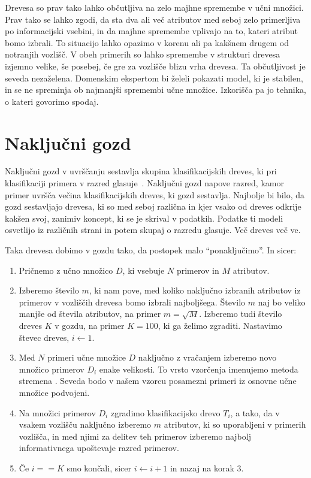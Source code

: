 Drevesa so prav tako lahko občutljiva na zelo majhne spremembe v učni množici. Prav tako se lahko zgodi, da sta dva ali več atributov med seboj zelo primerljiva po informacijski vsebini, in da majhne spremembe vplivajo na to, kateri atribut bomo izbrali. To situacijo lahko opazimo v korenu ali pa kakšnem drugem od notranjih vozlišč. V obeh primerih so lahko spremembe v strukturi drevesa izjemno velike, še posebej, če gre za vozlišče blizu vrha drevesa. Ta občutljivost je seveda nezaželena. Domenskim ekspertom bi želeli pokazati model, ki je stabilen, in se ne spreminja ob najmanjši spremembi učne množice. Izkorišča pa jo tehnika, o kateri govorimo spodaj.

\section{Naključni gozd}

Naključni gozd  v uvrščanju sestavlja skupina klasifikacijskih dreves, ki pri klasifikaciji primera v razred glasuje~\cite{}. Naključni gozd napove razred, kamor primer uvršča večina klasifikacijskih dreves, ki gozd sestavlja. Najbolje bi bilo, da gozd sestavljajo drevesa, ki so med seboj različna in kjer vsako od dreves odkrije kakšen svoj, zanimiv koncept, ki se je skrival v podatkih. Podatke ti modeli osvetlijo iz različnih strani in potem skupaj o razredu glasuje. Več dreves več ve.

Taka drevesa dobimo v gozdu tako, da postopek malo ``ponaključimo''. In sicer:
\begin{enumerate}
\item Pričnemo z učno množico $D$, ki vsebuje $N$ primerov in $M$ atributov.
\item Izberemo število $m$, ki nam pove, med koliko naključno izbranih atributov iz primerov v vozliščih drevesa bomo izbrali najboljšega. Število $m$ naj bo veliko manjše od števila atributov, na primer $m=\sqrt{M}$. Izberemo tudi število dreves $K$ v gozdu, na primer $K=100$, ki ga želimo zgraditi. Nastavimo števec dreves, $i\leftarrow 1$.
\item Med $N$ primeri učne množice $D$ naključno z vračanjem izberemo novo množico primerov $D_i$ enake velikosti. To vrsto vzorčenja imenujemo metoda stremena . Seveda bodo v našem vzorcu posamezni primeri iz osnovne učne množice podvojeni.
\item Na množici primerov $D_i$ zgradimo klasifikacijsko drevo $T_i$, a tako, da v vsakem vozlišču naključno izberemo $m$ atributov, ki so uporabljeni v primerih vozlišča, in med njimi za delitev teh primerov izberemo najbolj informativnega upoštevaje razred primerov.
\item Če $i==K$ smo končali, sicer $i\leftarrow i+1$ in nazaj na korak 3.
\end{enumerate}

